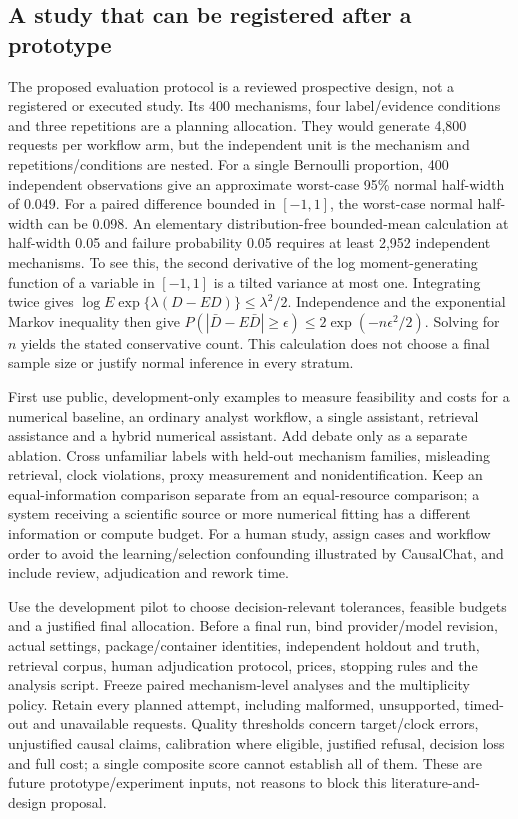 \hypertarget{a-study-that-can-be-registered-after-a-prototype}{%
\subsection{A study that can be registered after a
prototype}\label{a-study-that-can-be-registered-after-a-prototype}}

The proposed evaluation protocol is a reviewed prospective design, not a
registered or executed study. Its 400 mechanisms, four label/evidence
conditions and three repetitions are a planning allocation. They would
generate 4,800 requests per workflow arm, but the independent unit is
the mechanism and repetitions/conditions are nested. For a single
Bernoulli proportion, 400 independent observations give an approximate
worst-case 95\% normal half-width of 0.049. For a paired difference
bounded in \([-1,1]\), the worst-case normal half-width can be 0.098. An
elementary distribution-free bounded-mean calculation at half-width 0.05
and failure probability 0.05 requires at least 2,952 independent
mechanisms. To see this, the second derivative of the log
moment-generating function of a variable in \([-1,1]\) is a tilted
variance at most one. Integrating twice gives
\(\log E\exp\{\lambda(D-ED)\}\leq\lambda^2/2\). Independence and the
exponential Markov inequality then give
\(P(|\bar D-E\bar D|\geq\epsilon)\leq2\exp(-n\epsilon^2/2)\). Solving
for \(n\) yields the stated conservative count. This calculation does
not choose a final sample size or justify normal inference in every
stratum. \citep{exec14_evaluation_oracle}

First use public, development-only examples to measure feasibility and
costs for a numerical baseline, an ordinary analyst workflow, a single
assistant, retrieval assistance and a hybrid numerical assistant. Add
debate only as a separate ablation. Cross unfamiliar labels with
held-out mechanism families, misleading retrieval, clock violations,
proxy measurement and nonidentification. Keep an equal-information
comparison separate from an equal-resource comparison; a system
receiving a scientific source or more numerical fitting has a different
information or compute budget. For a human study, assign cases and
workflow order to avoid the learning/selection confounding illustrated
by CausalChat, and include review, adjudication and rework time.

Use the development pilot to choose decision-relevant tolerances,
feasible budgets and a justified final allocation. Before a final run,
bind provider/model revision, actual settings, package/container
identities, independent holdout and truth, retrieval corpus, human
adjudication protocol, prices, stopping rules and the analysis script.
Freeze paired mechanism-level analyses and the multiplicity policy.
Retain every planned attempt, including malformed, unsupported,
timed-out and unavailable requests. Quality thresholds concern
target/clock errors, unjustified causal claims, calibration where
eligible, justified refusal, decision loss and full cost; a single
composite score cannot establish all of them. These are future
prototype/experiment inputs, not reasons to block this
literature-and-design proposal.

